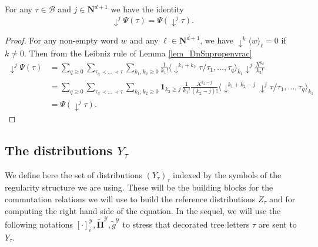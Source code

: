 \documentclass[11pt]{preprint}
\newcommand{\mcB}{\mathcal{B}}
\def\PPi{\boldsymbol{\Pi}}
\renewcommand{\lg}{\langle}
\newcommand{\rg}{\rangle}
\newcommand{\bfN}{\mathbf{N}}
\begin{document}
	
	
	
	\begin{lemma}\label{lem_commutdownarrowPsi}
		For any $\tau\in\mcB$ and $j\in\bfN^{d+1}$ we have the identity
		$$
		\downarrow^j\Psi(\tau) = \Psi(\downarrow^j\tau).
		$$
	\end{lemma}
	\begin{proof}
		For any non-empty word $w$ and any $\ell\in\bfN^{d+1}$, we have $\downarrow^k\lg w\rg_\ell =0$ if $k\ne 0$. Then from the Leibniz rule of Lemma \ref{lem_DnSnpropenvrac}
		\begin{align*}
			\downarrow^j\Psi(\tau) &= \sum_{q\geq0}\sum_{\tau_q\prec\dots\prec\tau}\sum_{k_1,k_2\geq0} \frac{1}{k_1!}\Big\lg \downarrow^{k_1+k_2}\tau/\tau_1,\dots , \tau_q \Big\rg_{k_1} \downarrow^j \frac{X^{k_2}}{k_2!}
			\\
			&=\sum_{q\geq 0}\sum_{\tau_q\prec\dots\prec\tau}\sum_{k_1,k_2\geq0} \mathbf{1}_{k_2\geq j} \, \frac{1}{k_1!} \frac{X^{k_2-j}}{(k_2-j)!} \Big\lg \downarrow^{k_1+k_2-j}\downarrow^{j}\tau/\tau_1,\dots ,\tau_q \Big\rg_{k_1}  
			\\
			&= \Psi(\downarrow^j\tau).
		\end{align*}
	\end{proof}
	
	
	
	
	
	\subsection{ The distributions $Y_\tau$  \  }
	
	We define here the set of distributions $(Y_\tau)_\tau$ indexed by the symbols of the regularity structure we are using. These will be the building blocks for the commutation relations we will use to build the reference distributions $Z_\tau$ and for computing the right hand side of the equation. In the sequel, we will use the following notations $ [\cdot]_i^{\mathcal{Y}}, \widetilde{\PPi}^{\mathcal{Y}}, \widetilde{g}^{\mathcal{Y}} $ to stress that decorated tree letters $ \tau $ are sent to $Y_{\tau}$.
	
\end{document}
